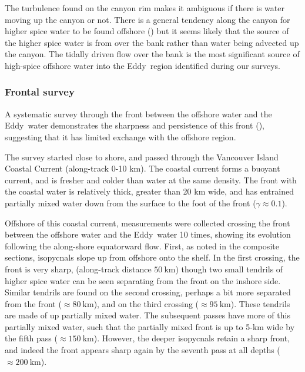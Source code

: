 \documentclass[draft]{agujournal2019}
\newcommand*{\Eddy}{{\sc Eddy}}
\begin{document}
The turbulence found on the canyon rim makes it ambiguous if there is water moving up the canyon or not.  There is a general tendency along the canyon for higher spice water to be found offshore () but it seems likely that the source of the higher spice water is from over the bank rather than water being advected up the canyon.  The tidally driven flow over the bank is the most significant source of high-spice offshore water into the \Eddy\ region identified during our surveys.

\subsubsection{Frontal survey}
\label{sec:frontsurvey}

A systematic survey through the front between the offshore water and the \Eddy\ water demonstrates the sharpness and persistence of this front (), suggesting that it has limited exchange with the offshore region.

The survey started close to shore, and passed through the Vancouver Island Coastal Current (along-track 0-10 km).  The coastal current forms a buoyant current, and is fresher and colder than water at the same density.  The front with the coastal water is relatively thick, greater than 20 km wide, and has entrained partially mixed water down from the surface to the foot of the front ($\gamma\approx0.1$).

Offshore of this coastal current, measurements were collected crossing the front between the offshore water and the \Eddy\ water 10 times, showing its evolution following the along-shore equatorward flow.  First, as noted in the composite sections, isopycnals slope up from offshore onto the shelf.  In the first crossing, the front is very sharp, (along-track distance $50\ \mathrm{km}$) though two small tendrils of higher spice water can be seen separating from the front on the inshore side.  Similar tendrils are found on the second crossing, perhaps a bit more separated from the front ($\approx 80\ \mathrm{km}$), and on the third crossing ($\approx 95\ \mathrm{km}$).  These tendrils are made of up partially mixed water.  The subsequent passes have more of this partially mixed water, such that the partially mixed front is up to 5-km wide by the fifth pass ($\approx 150\ \mathrm{km}$).  However, the deeper isopycnals retain a sharp front, and indeed the front appears sharp again by the seventh pass at all depths ($\approx 200\ \mathrm{km}$).
\end{document}

